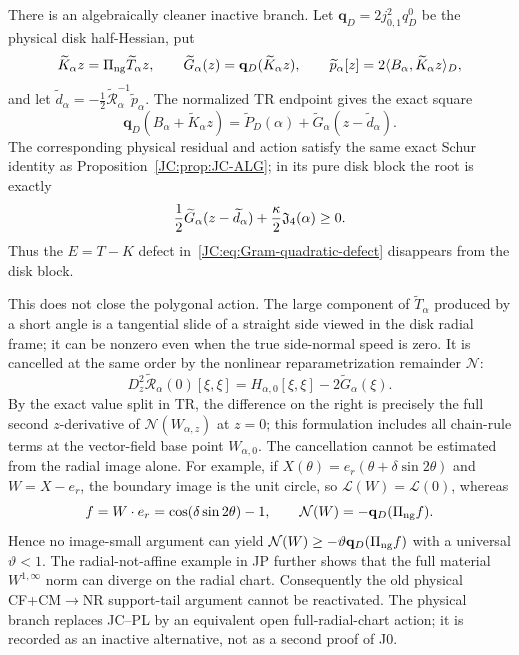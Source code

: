 \begin{remark}
There is an algebraically cleaner inactive branch.  Let
$\mathbf q_D=2j_{0,1}^2q_D^0$ be the physical disk half-Hessian, put
\[
 \widetilde K_\alpha z=\Pi_{\rm ng}\widetilde T_\alpha z,
 \qquad
 \widetilde G_\alpha(z)=\mathbf q_D(\widetilde K_\alpha z),
 \qquad
 \widetilde p_\alpha[z]
 =2\langle B_\alpha,\widetilde K_\alpha z\rangle_D,
\]
and let
$\widetilde d_\alpha=-\tfrac12\widetilde{\mathcal R}_\alpha^{-1}
\widetilde p_\alpha$.  The normalized TR endpoint gives the exact square
\[
 \mathbf q_D(B_\alpha+\widetilde K_\alpha z)
 =\widetilde P_D(\alpha)
  +\widetilde G_\alpha(z-\widetilde d_\alpha).
\]
The corresponding physical residual and action satisfy the same exact
Schur identity as Proposition~\ref{JC:prop:JC-ALG}; in its pure disk block
the root is exactly
\[
 \frac12\widetilde G_\alpha(z-\widetilde d_\alpha)
 +\frac\kappa2\mathfrak J_4(\alpha)\ge0.
\]
Thus the $E=T-K$ defect in~\eqref{JC:eq:Gram-quadratic-defect} disappears
from the disk block.

This does not close the polygonal action.  The large component of
$\widetilde T_\alpha$ produced by a short angle is a tangential slide of a
straight side viewed in the disk radial frame; it can be nonzero even
when the true side-normal speed is zero.  It is cancelled at the same
order by the nonlinear reparametrization remainder $\mathcal N$:
\[
 D_z^2\widetilde{\mathscr R}_\alpha(0)[\xi,\xi]
 =H_{\alpha,0}[\xi,\xi]-2\widetilde G_\alpha(\xi).
\]
By the exact value split in TR, the difference on the right is precisely
the full second $z$-derivative of $\mathcal N(W_{\alpha,z})$ at $z=0$;
this formulation includes all chain-rule terms at the vector-field base
point $W_{\alpha,0}$.
The cancellation cannot be estimated from the radial image alone.  For
example, if
$X(\theta)=e_r(\theta+\delta\sin2\theta)$ and $W=X-e_r$, the boundary
image is the unit circle, so $\mathcal L(W)=\mathcal L(0)$, whereas
\[
 f=W\cdot e_r=\cos(\delta\sin2\theta)-1,
 \qquad
 \mathcal N(W)=-\mathbf q_D(\Pi_{\rm ng}f).
\]
Hence no image-small argument can yield
$\mathcal N(W)\ge-\vartheta\mathbf q_D(\Pi_{\rm ng}f)$ with a universal
$\vartheta<1$.  The radial-not-affine example in JP further shows that
the full material $W^{1,\infty}$ norm can diverge on the radial chart.
Consequently the old physical CF+CM$\to$NR support-tail argument cannot
be reactivated.  The physical branch replaces JC--PL by an equivalent
open full-radial-chart action; it is recorded as an inactive alternative,
not as a second proof of J0.
\end{remark}

